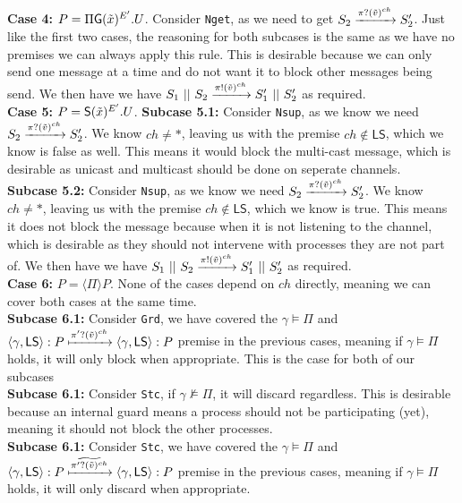 \textbf{Case 4: } $P=\Pi \mathsf{G} (\Tilde{x})^{E'}.U $. Consider \texttt{Nget}, as we need to get $S_2 \xrightarrow[]{\pi ?(\Tilde{v})^{ch}} S_2'$. Just like the first two cases, the reasoning for both subcases is the same as we have no premises we can always apply this rule. This is desirable because we can only send one message at a time and do not want it to block other messages being send. We then have we have $S_1\ ||\ S_2 \xrightarrow[]{\pi !(\Tilde{v})^{ch}}S_1'\ ||\ S_2'$ as required.\\
\textbf{Case 5: } $P=\mathsf{S} (\Tilde{x})^{E'}.U$.
\indent \textbf{Subcase 5.1: } Consider \texttt{Nsup}, as we know we need $S_2 \xrightarrow[]{\pi ?(\Tilde{v})^{ch}} S_2'$. We know $ch\not = *$, leaving us with the premise $ch \not \in \mathsf{LS}$, which we know is false as well. This means it would block the multi-cast message, which is desirable as unicast and multicast should be done on seperate channels.\\
\indent \textbf{Subcase 5.2: } Consider \texttt{Nsup}, as we know we need $S_2 \xrightarrow[]{\pi ?(\Tilde{v})^{ch}} S_2'$. We know $ch\not = *$, leaving us with the premise $ch \not \in \mathsf{LS}$, which we know is true. This means it does not block the message because when it is not listening to the channel, which is desirable as they should not intervene with processes they are not part of. We then have we have $S_1\ ||\ S_2 \xrightarrow[]{\pi !(\Tilde{v})^{ch}}S_1'\ ||\ S_2'$ as required.\\
\textbf{Case 6: } $P=\langle \Pi \rangle P$. None of the cases depend on $ch$ directly, meaning we can cover both cases at the same time.\\
\indent \textbf{Subcase 6.1: } Consider \texttt{Grd}, we have covered the $\gamma \models \Pi$ and $\langle \gamma, \mathsf{LS}\rangle : P \xmapsto[]{\pi '? (\Tilde{v})^{ch}}\langle \gamma, \mathsf{LS}\rangle : P$ premise in the previous cases, meaning if $\gamma \models \Pi$ holds, it will only block when appropriate. This is the case for both of our subcases\\
\indent \textbf{Subcase 6.1: } Consider \texttt{Stc}, if $\gamma \not \models \Pi$, it will discard regardless. This is desirable because an internal guard means a process should not be participating (yet), meaning it should not block the other processes.\\
\indent \textbf{Subcase 6.1: } Consider \texttt{Stc}, we have covered the $\gamma \models \Pi$ and $\langle \gamma, \mathsf{LS}\rangle : P \xmapsto[]{\widetilde{\pi '? (\Tilde{v})^{ch}}}\langle \gamma, \mathsf{LS}\rangle : P$ premise in the previous cases, meaning if $\gamma \models \Pi$ holds, it will only discard when appropriate.\\
